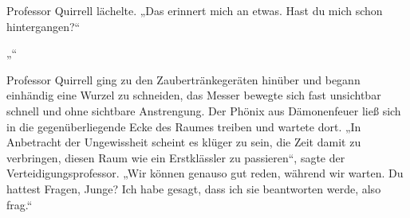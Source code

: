 Professor Quirrell lächelte.
„Das erinnert mich an etwas. Hast du mich schon hintergangen?“

„“

Professor Quirrell ging zu den Zaubertränkegeräten hinüber und begann einhändig eine Wurzel zu schneiden, das Messer bewegte sich fast unsichtbar schnell und ohne sichtbare Anstrengung. Der Phönix aus Dämonenfeuer ließ sich in die gegenüberliegende Ecke des Raumes treiben und wartete dort.
„In Anbetracht der Ungewissheit scheint es klüger zu sein, die Zeit damit zu verbringen, diesen Raum wie ein Erstklässler zu passieren“, sagte der Verteidigungsprofessor.
„Wir können genauso gut reden, während wir warten. Du hattest Fragen, Junge? Ich habe gesagt, dass ich sie beantworten werde, also frag.“

